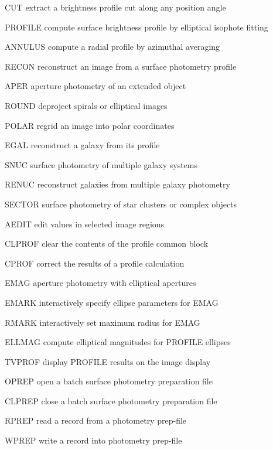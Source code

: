 {\newpage\clearpage
{}%
\begin{example}
  \item[CUT\hfill]{extract a brightness profile cut along any position angle}
  \item[PROFILE\hfill]{compute surface brightness profile by elliptical
       isophote fitting}
  \item[ANNULUS\hfill]{compute a radial profile by azimuthal averaging}
  \item[RECON\hfill]{reconstruct an image from a surface photometry profile}
  \item[APER\hfill]{aperture photometry of an extended object}
  \item[ROUND\hfill]{deproject spirals or elliptical images}
  \item[POLAR\hfill]{regrid an image into polar coordinates}
  \item[EGAL\hfill]{reconstruct a galaxy from its profile}
  \item[SNUC\hfill]{surface photometry of multiple galaxy systems}
  \item[RENUC\hfill]{reconstruct galaxies from multiple galaxy photometry}
  \item[SECTOR\hfill]{surface photometry of star clusters or complex
       objects} 
  \item[AEDIT\hfill]{edit values in selected image regions}
  \item[CLPROF\hfill]{clear the contents of the profile common block}
  \item[CPROF\hfill]{correct the results of a profile calculation}
  \item[EMAG\hfill]{aperture photometry with elliptical apertures}
  \item[EMARK\hfill]{interactively specify ellipse parameters for EMAG} 
  \item[RMARK\hfill]{interactively set maximum radius for EMAG}
  \item[ELLMAG\hfill]{compute elliptical magnitudes for PROFILE ellipses}
  \item[TVPROF\hfill]{display PROFILE results on the image display}
  \item[OPREP\hfill]{open a batch surface photometry preparation file}
  \item[CLPREP\hfill]{close a batch surface photometry preparation file}
  \item[RPREP\hfill]{read a record from a photometry prep-file}
  \item[WPREP\hfill]{write a record into photometry prep-file}
\end{example}%
\lthtmlfigureZ
\lthtmlcheckvsize\clearpage}


